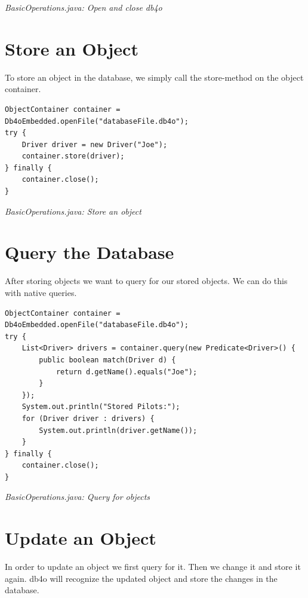 {\small\itshape BasicOperations.java: Open and close db4o\par}
\medskip

\section{Store an Object}
\label{tut:basics:storeobject}

To store an object in the database, we simply call the store-method on the object container.

\begin{lstlisting}
ObjectContainer container = Db4oEmbedded.openFile("databaseFile.db4o");
try {
    Driver driver = new Driver("Joe");
    container.store(driver);
} finally {
    container.close();
}
\end{lstlisting}

{\small\itshape BasicOperations.java: Store an object\par}
\medskip

\section{Query the Database}
\label{tut:basics:querydb}

After storing objects we want to query for our stored objects. We can do this with native queries.

\begin{lstlisting}
ObjectContainer container = Db4oEmbedded.openFile("databaseFile.db4o");
try {
    List<Driver> drivers = container.query(new Predicate<Driver>() {
        public boolean match(Driver d) {
            return d.getName().equals("Joe");
        }
    });
    System.out.println("Stored Pilots:");
    for (Driver driver : drivers) {
        System.out.println(driver.getName());
    }
} finally {
    container.close();
}
\end{lstlisting}

{\small\itshape BasicOperations.java: Query for objects\par}
\medskip

\section{Update an Object}
\label{tut:basics:updateobject}

In order to update an object we first query for it. Then we change it and store it again. db4o will recognize the updated object and store the changes in the database.

